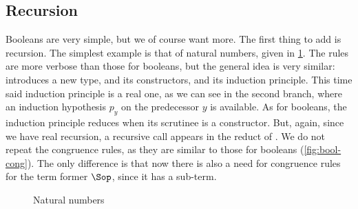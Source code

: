 \subsection{Recursion}

Booleans are very simple, but we of course want more. The first thing to add is recursion.
The simplest example is that of natural numbers, given in \cref{fig:nat}.
The rules are more verbose than those for booleans, but the general idea is very similar:
 introduces a new type, 
and  its constructors, and  its induction
principle. This time said induction principle is a real one, as we can see in
the second branch, where an induction hypothesis $p_{y}$ on the predecessor $y$ is available.
As for booleans, the induction principle reduces when its scrutinee is a constructor.
But, again, since we have real recursion,
a recursive call appears in the reduct of .
We do not repeat the congruence rules, as they are similar to those for booleans
(\cref{fig:bool-cong}). The only difference is that now there is also a need for congruence
rules for the term former $\Sop$, since it has a sub-term.

\begin{figure}[h]
  \AP
  \caption{Natural numbers}
  \label{fig:nat}
\end{figure}

